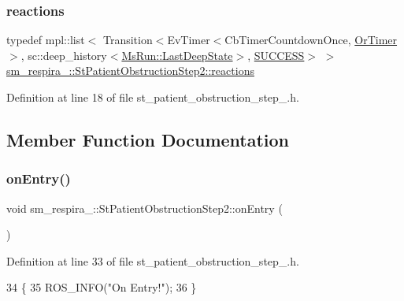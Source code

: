 \subsubsection{\texorpdfstring{reactions}{reactions}}
{\footnotesize\ttfamily typedef mpl\+::list$<$ Transition$<$Ev\+Timer$<$Cb\+Timer\+Countdown\+Once, \hyperlink{classsm__respira__1_1_1OrTimer}{Or\+Timer}$>$, sc\+::deep\+\_\+history$<$\hyperlink{classsmacc_1_1SmaccState_a60088405d2d99d468caa0baa3b2830a8}{Ms\+Run\+::\+Last\+Deep\+State}$>$, \hyperlink{classSUCCESS}{S\+U\+C\+C\+E\+SS}$>$ $>$ \hyperlink{structsm__respira__1_1_1StPatientObstructionStep2_a24a90978e9c1965e54f3dcb958c4b302}{sm\+\_\+respira\+\_\+::\+St\+Patient\+Obstruction\+Step2\+::reactions}}



Definition at line 18 of file st\+\_\+patient\+\_\+obstruction\+\_\+step\+\_.\+h.



\subsection{Member Function Documentation}
\mbox{\label{structsm__respira__1_1_1StPatientObstructionStep2_aefafc28315b5312e1f0d5639678f238c}} 
\subsubsection{\texorpdfstring{on\+Entry()}{onEntry()}}
{\footnotesize\ttfamily void sm\+\_\+respira\+\_\+::\+St\+Patient\+Obstruction\+Step2\+::on\+Entry (\begin{DoxyParamCaption}{ }\end{DoxyParamCaption})\hspace{0.3cm}{\ttfamily [inline]}}



Definition at line 33 of file st\+\_\+patient\+\_\+obstruction\+\_\+step\+\_.\+h.


\begin{DoxyCode}
34     \{
35         ROS\_INFO(\textcolor{stringliteral}{"On Entry!"});
36     \}
\end{DoxyCode}
\mbox{\label{structsm__respira__1_1_1StPatientObstructionStep2_a5ed886cbef1e1f31324b4cb97f37be1f}} 

